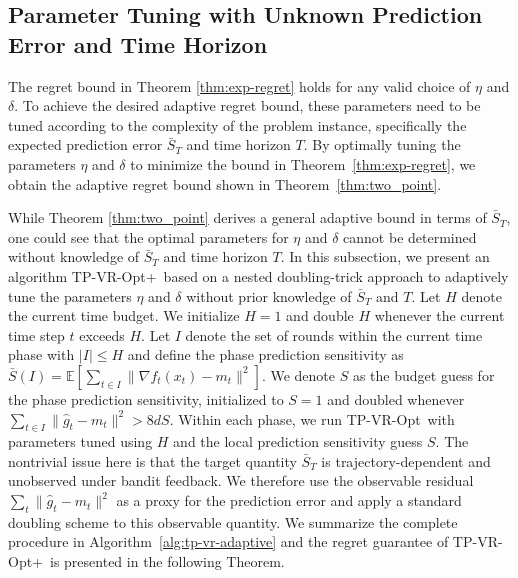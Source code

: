 \documentclass[journal,onecolumn]{IEEEtran}
\theoremstyle{plain}
\theoremstyle{definition}
\theoremstyle{remark}
\newcommand{\tpvr}{{\sc TP-VR-Opt}}
\newcommand{\tpvrplus}{{\sc TP-VR-Opt+}}
\begin{document}
\subsection{Parameter Tuning with Unknown Prediction Error and Time Horizon}
\label{sec:tp-vr-adaptive}

The regret bound in Theorem \ref{thm:exp-regret} holds for any valid choice of $\eta$
and $\delta$. To achieve the desired adaptive regret bound, these parameters need
to be tuned according to the complexity of the problem instance, specifically
the expected prediction error $\bar S_{T}$ and time horizon $T$. By optimally tuning
the parameters $\eta$ and $\delta$ to minimize the bound in Theorem~\ref{thm:exp-regret},
we obtain the adaptive regret bound shown in Theorem~\ref{thm:two_point}.

While Theorem \ref{thm:two_point} derives a general adaptive bound in terms of $\bar{S}_T$, one could see that the optimal parameters for $\eta$ and $\delta$ cannot
be determined without knowledge of $\bar S_{T}$ and time horizon $T$. In this subsection, we present an algorithm \tpvrplus\, based on a nested doubling-trick
approach to adaptively tune the parameters $\eta$ and $\delta$ without prior
knowledge of $\bar S_{T}$ and $T$. Let $H$ denote the current time budget. We
initialize $H=1$ and double $H$ whenever the current time step $t$ exceeds $H$. Let
$I$ denote the set of rounds within the current time phase with $|I|\leq H$ and define
the phase prediction sensitivity as $\bar S(I)=\mathbb{E}\left[\sum_{t\in I}\|\nabla
f_{t}( x_{t})-m_{t}\|^{2}\right]$. We denote $S$ as the budget guess for the
phase prediction sensitivity, initialized to $S=1$ and doubled whenever $\sum_{t\in
I}\| \hat g_{t}-m_{t}\|^{2}>8dS$. Within each phase, we run \tpvr\, with
parameters tuned using $H$ and the local prediction sensitivity guess $S$. The nontrivial issue here is that the target
quantity $\bar S_T$ is trajectory-dependent and unobserved under bandit feedback.
We therefore use the observable residual $\sum_t\|\widehat g_t-m_t\|^2$ as a
proxy for the prediction error and apply a standard doubling scheme to this
observable quantity. We summarize
the complete procedure in Algorithm~\ref{alg:tp-vr-adaptive} and the regret guarantee of \tpvrplus\, is presented in the following Theorem.
\end{document}
